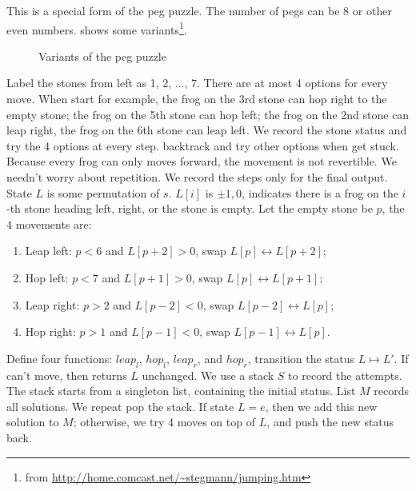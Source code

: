 \documentclass[b5paper]{article}
\begin{document}
This is a special form of the peg puzzle. The number of pegs can be 8 or other even numbers.  shows some variants\footnote{from \url{http://home.comcast.net/~stegmann/jumping.htm}}.

\begin{figure}[htbp]
 \centering
  \hspace{0.02\textwidth}
  \hspace{0.02\textwidth}
 \caption{Variants of the peg puzzle}
 \label{fig:pegpuzzles}
\end{figure}

Label the stones from left as 1, 2, ..., 7. There are at most 4 options for every move. When start for example, the frog on the 3rd stone can hop right to the empty stone; the frog on the 5th stone can hop left; the frog on the 2nd stone can leap right, the frog on the 6th stone can leap left. We record the stone status and try the 4 options at every step. backtrack and try other options when get stuck. Because every frog can only moves forward, the movement is not revertible. We needn't worry about repetition. We record the steps only for the final output. State $L$ is some permutation of $s$. $L[i]$ is $\pm 1, 0$, indicates there is a frog on the $i$-th stone heading left, right, or the stone is empty. Let the empty stone be $p$, the 4 movements are:

\begin{enumerate}
\item Leap left: $p < 6$ and $L[p+2] > 0$, swap $L[p] \leftrightarrow L[p+2]$;
\item Hop left: $p < 7$ and $L[p+1] > 0$, swap $L[p] \leftrightarrow L[p+1]$;
\item Leap right: $p > 2$ and $L[p-2] < 0$, swap $L[p-2] \leftrightarrow L[p]$;
\item Hop right: $p > 1$ and $L[p-1] < 0$, swap $L[p-1] \leftrightarrow L[p]$.
\end{enumerate}

Define four functions: $leap_l$, $hop_l$, $leap_r$, and $hop_r$, transition the status $L \mapsto L'$. If can't move, then returns $L$ unchanged. We use a stack $S$ to record the attempts. The stack starts from a singleton list, containing the initial status. List $M$ records all solutions. We repeat pop the stack. If state $L = e$, then we add this new solution to $M$; otherwise, we try 4 moves on top of $L$, and push the new status back.
\end{document}
